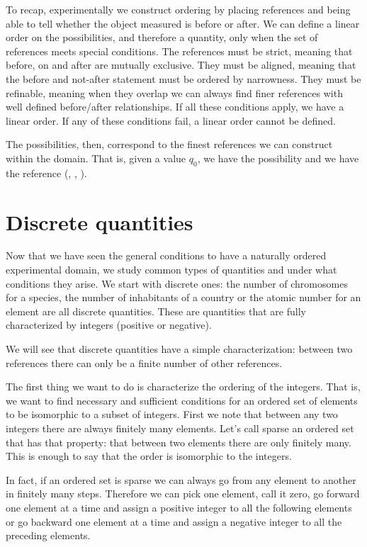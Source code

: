 To recap, experimentally we construct ordering by placing references and being able to tell whether the object measured is before or after. We can define a linear order on the possibilities, and therefore a quantity, only when the set of references meets special conditions. The references must be strict, meaning that before, on and after are mutually exclusive. They must be aligned, meaning that the before and not-after statement must be ordered by narrowness. They must be refinable, meaning when they overlap we can always find finer references with well defined before/after relationships. If all these conditions apply, we have a linear order. If any of these conditions fail, a linear order cannot be defined.

The possibilities, then, correspond to the finest references we can construct within the domain. That is, given a value $q_0$, we have the possibility  and we have the reference (, , ).

\section{Discrete quantities}

Now that we have seen the general conditions to have a naturally ordered experimental domain, we study common types of quantities and under what conditions they arise. We start with discrete ones: the number of chromosomes for a species, the number of inhabitants of a country or the atomic number for an element are all discrete quantities. These are quantities that are fully characterized by integers (positive or negative).

We will see that discrete quantities have a simple characterization: between two references there can only be a finite number of other references.

The first thing we want to do is characterize the ordering of the integers. That is, we want to find necessary and sufficient conditions for an ordered set of elements to be isomorphic to a subset of integers. First we note that between any two integers there are always finitely many elements. Let's call sparse an ordered set that has that property: that between two elements there are only finitely many. This is enough to say that the order is isomorphic to the integers.

In fact, if an ordered set is sparse we can always go from any element to another in finitely many steps. Therefore we can pick one element, call it zero, go forward one element at a time and assign a positive integer to all the following elements or go backward one element at a time and assign a negative integer to all the preceding elements.


